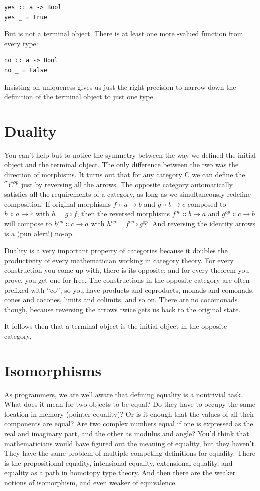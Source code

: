 \begin{Verbatim}
yes :: a -> Bool
yes _ = True
\end{Verbatim}
But  is not a terminal object. There is at least one more
-valued function from every type:

\begin{Verbatim}
no :: a -> Bool
no _ = False
\end{Verbatim}
Insisting on uniqueness gives us just the right precision to narrow down
the definition of the terminal object to just one type.

\section{Duality}

You can't help but to notice the symmetry between the way we defined the
initial object and the terminal object. The only difference between the
two was the direction of morphisms. It turns out that for any category C
we can define the  $\cat{C}^{op}$ just by
reversing all the arrows. The opposite category automatically satisfies
all the requirements of a category, as long as we simultaneously
redefine composition. If original morphisms
$f \Colon a \to b$ and $g \Colon b \to c$ composed
to $h \Colon a \to c$ with $h = g \circ f$, then the reversed
morphisms $f^{op} \Colon b \to a$ and $g^{op} \Colon c \to b$ will compose to
$h^{op} \Colon c \to a$ with $h^{op} = f^{op} \circ g^{op}$. And reversing
the identity arrows is a (pun alert!) no-op.

Duality is a very important property of categories because it doubles
the productivity of every mathematician working in category theory. For
every construction you come up with, there is its opposite; and for
every theorem you prove, you get one for free. The constructions in the
opposite category are often prefixed with ``co'', so you have products
and coproducts, monads and comonads, cones and cocones, limits and
colimits, and so on. There are no cocomonads though, because reversing
the arrows twice gets us back to the original state.

It follows then that a terminal object is the initial object in the
opposite category.

\section{Isomorphisms}

As programmers, we are well aware that defining equality is a nontrivial
task. What does it mean for two objects to be equal? Do they have to
occupy the same location in memory (pointer equality)? Or is it enough
that the values of all their components are equal? Are two complex
numbers equal if one is expressed as the real and imaginary part, and
the other as modulus and angle? You'd think that mathematicians would
have figured out the meaning of equality, but they haven't. They have
the same problem of multiple competing definitions for equality. There
is the propositional equality, intensional equality, extensional
equality, and equality as a path in homotopy type theory. And then there
are the weaker notions of isomorphism, and even weaker of equivalence.

